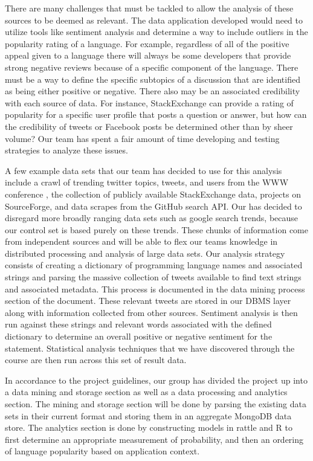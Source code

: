 \documentclass{sig-alternate}
\begin{document}
There are many challenges that must be tackled to allow the analysis of these sources to be deemed as relevant. The data application developed would need to utilize tools like sentiment analysis and determine a way to include outliers in the popularity rating of a language. For example, regardless of all of the positive appeal given to a language there will always be some developers that provide strong negative reviews because of a specific component of the language. There must be a way to define the specific subtopics of a discussion that are identified as being either positive or negative. There also may be an associated credibility with each source of data. For instance, StackExchange can provide a rating of popularity for a specific user profile that posts a question or answer, but how can the credibility of tweets or Facebook posts be determined other than by sheer volume? Our team has spent a fair amount of time developing and testing strategies to analyze these issues. 

A few example data sets that our team has decided to use for this analysis include a crawl of trending twitter topics, tweets, and users from the WWW conference \cite{Kwak10www}, the collection of publicly available StackExchange data, projects on SourceForge, and data scrapes from the GitHub search API. Our has decided to disregard more broadly ranging data sets such as google search trends, because our control set is based purely on these trends.  These chunks of information come from independent sources and will be able to flex our team\textsc{}s knowledge in distributed processing and analysis of large data sets. Our analysis strategy consists of creating a dictionary of programming language names and associated strings and parsing the massive collection of tweets available to find text strings and associated metadata. This process is documented in the data mining process section of the document. These relevant tweets are stored in our DBMS layer along with information collected from other sources. Sentiment analysis is then run against these strings and relevant words associated with the defined dictionary to determine an overall positive or negative sentiment for the statement. Statistical analysis techniques that we have discovered through the course are then run across this set of result data. 

In accordance to the project guidelines, our group has divided the project up into a data mining and storage section as well as a data processing and analytics section. The mining and storage section will be done by parsing the existing data sets in their current format and storing them in an aggregate MongoDB data store. The analytics section is done by constructing models in rattle and R to first determine an appropriate measurement of probability, and then an ordering of language popularity based on application context.
\end{document}
